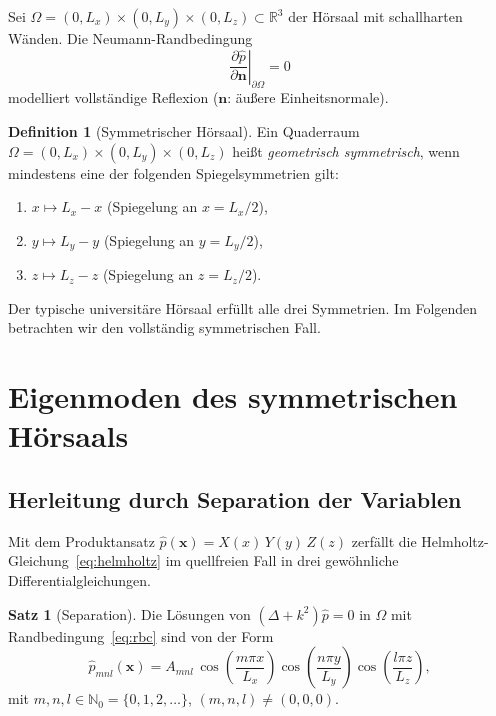 ﻿\documentclass[12pt, a4paper]{article}
\theoremstyle{definition}
\newtheorem{definition}{Definition}[section]
\newtheorem{satz}{Satz}[section]
\theoremstyle{remark}
\newcommand{\R}{\mathbb{R}}
\newcommand{\N}{\mathbb{N}}
\newcommand{\Lx}{L_x}
\newcommand{\Ly}{L_y}
\newcommand{\Lz}{L_z}
\newcommand{\pfrac}[2]{\frac{\partial #1}{\partial #2}}
\begin{document}
Sei $\Omega = (0,\Lx) \times (0,\Ly) \times (0,\Lz) \subset \R^3$
der Hörsaal mit schallharten Wänden. Die Neumann-Randbedingung
\begin{equation}
  \left.\pfrac{\hat{p}}{\mathbf{n}}\right|_{\partial\Omega} = 0
  \label{eq:rbc}
\end{equation}
modelliert vollständige Reflexion ($\mathbf{n}$: äußere Einheitsnormale).

\begin{definition}[Symmetrischer Hörsaal]
\label{def:sym_hoersaal}
Ein Quaderraum $\Omega = (0,\Lx)\times(0,\Ly)\times(0,\Lz)$ heißt
\emph{geometrisch symmetrisch}, wenn mindestens eine der folgenden
Spiegelsymmetrien gilt:
\begin{enumerate}[label=(\roman*)]
\item $x \mapsto \Lx - x$ (Spiegelung an $x = \Lx/2$),
\item $y \mapsto \Ly - y$ (Spiegelung an $y = \Ly/2$),
\item $z \mapsto \Lz - z$ (Spiegelung an $z = \Lz/2$).
\end{enumerate}
\end{definition}

Der typische universitäre Hörsaal erfüllt alle drei Symmetrien. Im Folgenden
betrachten wir den vollständig symmetrischen Fall.

\section{Eigenmoden des symmetrischen Hörsaals}
\label{sec:eigenmoden}

\subsection{Herleitung durch Separation der Variablen}

Mit dem Produktansatz $\hat{p}(\mathbf{x}) = X(x)\,Y(y)\,Z(z)$ zerfällt
die Helmholtz-Gleichung~\eqref{eq:helmholtz} im quellfreien Fall in drei
gewöhnliche Differentialgleichungen.

\begin{satz}[Separation]
\label{satz:separation}
Die Lösungen von $(\Delta + k^2)\hat{p} = 0$ in $\Omega$ mit
Randbedingung~\eqref{eq:rbc} sind von der Form
\begin{equation}
  \hat{p}_{mnl}(\mathbf{x}) = A_{mnl}\,
  \cos\!\left(\frac{m\pi x}{\Lx}\right)
  \cos\!\left(\frac{n\pi y}{\Ly}\right)
  \cos\!\left(\frac{l\pi z}{\Lz}\right),
  \label{eq:moden}
\end{equation}
mit $m,n,l \in \N_0 = \{0,1,2,\ldots\}$, $(m,n,l) \neq (0,0,0)$.
\end{satz}
\end{document}
